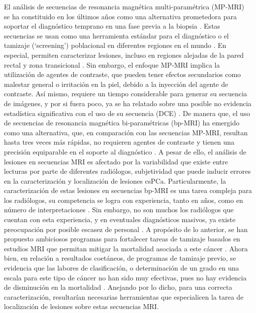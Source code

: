El análisis de secuencias de resonancia magnética multi-paramétrica (MP-MRI) se ha constituido en los últimos años como una alternativa prometedora para soportar el diagnóstico temprano en una fase previa a la biopsia . Estas secuencias se usan como una herramienta estándar para el diagnóstico o el tamizaje (`screening') poblacional en diferentes regiones en el mundo . En especial, permiten caracterizar lesiones, incluso en regiones alejadas de la pared rectal y zona transicional . Sin embargo, el enfoque MP-MRI implica la utilización de agentes de contraste, que pueden tener efectos secundarios como malestar general o irritación en la piel, debido a la inyección del agente de contraste. Así mismo, requiere un tiempo considerable para generar su secuencia de imágenes, y por si fuera poco, ya se ha relatado sobre una posible no evidencia estadística significativa con el uso de su secuencia (DCE) . De manera que, el uso de secuencias de resonancia magnética bi-paramétricas (bp-MRI) ha emergido como una alternativa, que,  en comparación con las secuencias MP-MRI, resultan hasta tres veces más rápidas, no requieren agentes de contraste y tienen una precisión equiparable en el soporte al diagnóstico .
A pesar de ello, el análisis de lesiones en secuencias MRI es afectado por la variabilidad que existe entre lecturas por parte de diferentes radiólogos, subjetividad que puede inducir errores en la caracterización y localización de lesiones csPCa. Particularmente, la caracterización de estas lesiones en secuencias bp-MRI es una tarea compleja para los radiólogos, su competencia se logra con experiencia, tanto en años, como en número de interpretaciones . Sin embargo, 
no son muchos los radiólogos que cuentan con esta experiencia, y en eventuales diagnósticos masivos, ya existe preocupación por posible escasez de personal . A propósito de lo anterior, se han propuesto ambiciosos programas para fortalecer tareas de tamizaje basados en estudios MRI que permitan mitigar la mortalidad asociada a este cáncer . Ahora bien, en relación a resultados coetáneos, de programas de tamizaje previo, se evidencia que las labores de clasificación, o determinación de un grado en una escala para este tipo de cáncer no han sido muy efectivas, pues no hay evidencia de disminución en la mortalidad . Anejando por lo dicho, para una correcta caracterización, resultarían necesarias herramientas que especialicen la tarea de localización de lesiones sobre estas secuencias MRI.\par

